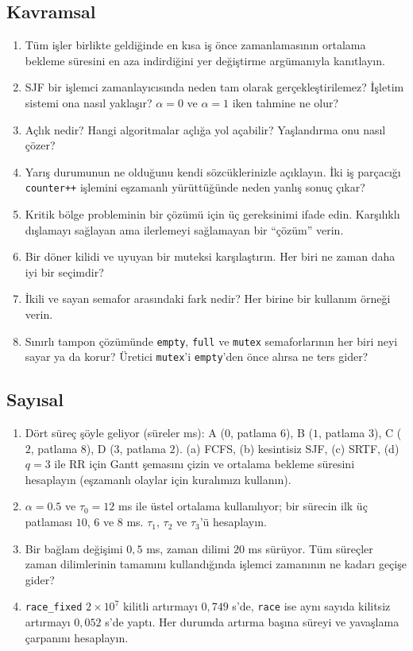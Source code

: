 \subsection*{Kavramsal}
\begin{enumerate}[leftmargin=1.6em]
  \item Tüm işler birlikte geldiğinde en kısa iş önce zamanlamasının ortalama bekleme süresini en aza indirdiğini yer değiştirme argümanıyla kanıtlayın.
  \item SJF bir işlemci zamanlayıcısında neden tam olarak gerçekleştirilemez? İşletim sistemi ona nasıl yaklaşır? $\alpha = 0$ ve $\alpha = 1$ iken tahmine ne olur?
  \item Açlık nedir? Hangi algoritmalar açlığa yol açabilir? Yaşlandırma onu nasıl çözer?
  \item Yarış durumunun ne olduğunu kendi sözcüklerinizle açıklayın. İki iş parçacığı \texttt{counter++} işlemini eşzamanlı yürüttüğünde neden yanlış sonuç çıkar?
  \item Kritik bölge probleminin bir çözümü için üç gereksinimi ifade edin. Karşılıklı dışlamayı sağlayan ama ilerlemeyi sağlamayan bir ``çözüm'' verin.
  \item Bir döner kilidi ve uyuyan bir muteksi karşılaştırın. Her biri ne zaman daha iyi bir seçimdir?
  \item İkili ve sayan semafor arasındaki fark nedir? Her birine bir kullanım örneği verin.
  \item Sınırlı tampon çözümünde \texttt{empty}, \texttt{full} ve \texttt{mutex} semaforlarının her biri neyi sayar ya da korur? Üretici \texttt{mutex}'i \texttt{empty}'den önce alırsa ne ters gider?
\end{enumerate}

\subsection*{Sayısal}
\begin{enumerate}[leftmargin=1.6em,resume]
  \item Dört süreç şöyle geliyor (süreler ms): A ($0$, patlama $6$), B ($1$, patlama $3$), C ($2$, patlama $8$), D ($3$, patlama $2$). (a) FCFS, (b) kesintisiz SJF, (c) SRTF, (d) $q=3$ ile RR için Gantt şemasını çizin ve ortalama bekleme süresini hesaplayın (eşzamanlı olaylar için kuralımızı kullanın).
  \item $\alpha = 0.5$ ve $\tau_0 = 12$ ms ile üstel ortalama kullanılıyor; bir sürecin ilk üç patlaması $10$, $6$ ve $8$ ms. $\tau_1$, $\tau_2$ ve $\tau_3$'ü hesaplayın.
  \item Bir bağlam değişimi $0{,}5$ ms, zaman dilimi $20$ ms sürüyor. Tüm süreçler zaman dilimlerinin tamamını kullandığında işlemci zamanının ne kadarı geçişe gider?
  \item \texttt{race\_fixed} $2\times10^{7}$ kilitli artırmayı $0{,}749$ s'de, \texttt{race} ise aynı sayıda kilitsiz artırmayı $0{,}052$ s'de yaptı. Her durumda artırma başına süreyi ve yavaşlama çarpanını hesaplayın.
\end{enumerate}

